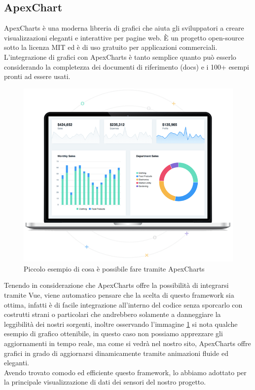 \documentclass{article}
\begin{document}
\subsection{ApexChart}
ApexCharts è una moderna libreria di grafici che aiuta gli sviluppatori a creare visualizzazioni eleganti e interattive per pagine web. È un progetto open-source sotto la licenza MIT ed è di uso gratuito per applicazioni commerciali.\\
L'integrazione di grafici con ApexCharts è tanto semplice quanto può esserlo considerando la completezza dei documenti di riferimento (docs) e i 100+ esempi pronti ad essere usati.\\
\begin{figure}[h!]
	\centering
	\includegraphics[scale=0.7]{apexchart.png}
	\caption{Piccolo esempio di cosa è possibile fare tramite ApexCharts}
	\label{fig:apexchart}
\end{figure}
Tenendo in considerazione che ApexCharts offre la possibilità di integrarsi tramite Vue, viene automatico pensare che la scelta di questo framework sia ottima, infatti è di facile integrazione all'interno del codice senza sporcarlo con costrutti strani o particolari che andrebbero solamente a danneggiare la leggibilità dei nostri sorgenti, inoltre osservando l'immagine \ref{fig:apexchart} si nota qualche esempio di grafico ottenibile, in questo caso non possiamo apprezzare gli aggiornamenti in tempo reale, ma come si vedrà nel nostro sito, ApexCharts offre grafici in grado di aggiornarsi dinamicamente tramite animazioni fluide ed eleganti.\\
Avendo trovato comodo ed efficiente questo framework, lo abbiamo adottato per la principale visualizzazione di dati dei sensori del nostro progetto.
\end{document}
